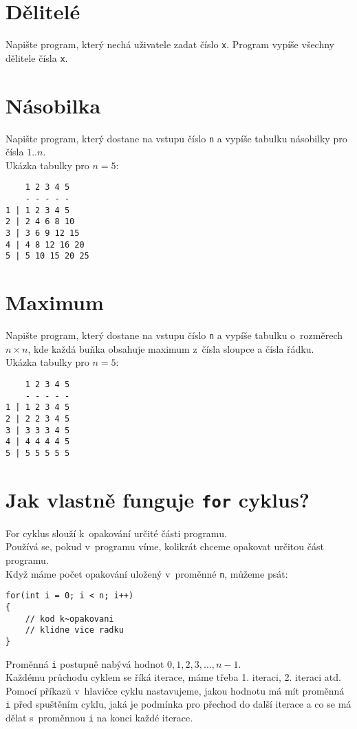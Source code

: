 \documentclass[12pt,a4paper]{article}
\begin{document}
\begin{multicols}{2}
\section{Dělitelé}
Napište program, který nechá uživatele zadat číslo \texttt{x}. Program vypíše
všechny dělitele čísla \texttt{x}.

\section{Násobilka}

Napište program, který dostane na vstupu číslo \texttt{n} a vypíše tabulku
násobilky pro čísla $1..n$.\\
Ukázka tabulky pro $n = 5$:

\begin{verbatim}
    1 2 3 4 5
    - - - - -
1 | 1 2 3 4 5
2 | 2 4 6 8 10
3 | 3 6 9 12 15
4 | 4 8 12 16 20
5 | 5 10 15 20 25
\end{verbatim}

\section{Maximum}

Napište program, který dostane na vstupu číslo \texttt{n} a vypíše tabulku
o~rozměrech $n \times n$, kde každá buňka obsahuje maximum z~čísla sloupce
a čísla řádku.\\
Ukázka tabulky pro $n = 5$:

\begin{verbatim}
    1 2 3 4 5
    - - - - -
1 | 1 2 3 4 5
2 | 2 2 3 4 5
3 | 3 3 3 4 5
4 | 4 4 4 4 5
5 | 5 5 5 5 5
\end{verbatim}

\end{multicols}

\newpage

\section*{Jak vlastně funguje \texttt{for} cyklus?}

For cyklus slouží k~opakování určité části programu.\\
Používá se, pokud v~programu víme, kolikrát chceme opakovat určitou část
programu.\\
Když máme počet opakování uložený v~proměnné \texttt{n}, můžeme psát:

\begin{verbatim}
for(int i = 0; i < n; i++)
{
    // kod k~opakovani
    // klidne vice radku
}
\end{verbatim}
Proměnná \texttt{i} postupně nabývá hodnot $0, 1, 2, 3, ..., n-1$.\\
Každému průchodu cyklem se říká iterace, máme třeba 1. iteraci, 2. iteraci atd.\\
Pomocí příkazů v~hlavičce cyklu nastavujeme, jakou hodnotu má mít proměnná \texttt{i}
před spuštěním cyklu, jaká je podmínka pro přechod do další iterace a co se
má dělat s~proměnnou \texttt{i} na konci každé iterace.
\end{document}
